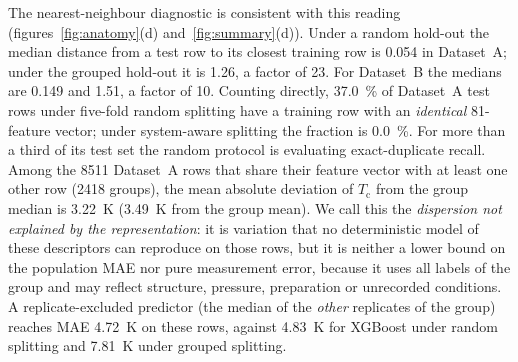 \documentclass{iopjournal}
\newcommand{\Tc}{T_{\mathrm c}}
\begin{document}
The nearest-neighbour diagnostic is consistent with this reading (figures~\ref{fig:anatomy}(d)
and~\ref{fig:summary}(d)). Under a random hold-out the median distance from a test row to its
closest training row is \num{0.054} in Dataset~A; under the grouped hold-out it is
\num{1.26}, a factor of \num{23}. For Dataset~B the medians are \num{0.149} and \num{1.51}, a
factor of \num{10}. Counting directly, \SI{37.0}{\percent} of Dataset~A test rows under five-fold
random splitting have a training row with an \emph{identical} \num{81}-feature vector; under
system-aware splitting the fraction is \SI{0.0}{\percent}. For more than a third of its test set the
random protocol is evaluating exact-duplicate recall. Among the \num{8511} Dataset~A rows that share
their feature vector with at least one other row (\num{2418} groups), the mean absolute deviation
of $\Tc$ from the group median is \SI{3.22}{\kelvin} (\SI{3.49}{\kelvin} from the group mean). We
call this the \emph{dispersion not explained by the representation}: it is variation that no
deterministic model of these descriptors can reproduce on those rows, but it is neither a lower
bound on the population MAE nor pure measurement error, because it uses all labels of the group and
may reflect structure, pressure, preparation or unrecorded conditions. A replicate-excluded
predictor (the median of the \emph{other} replicates of the group) reaches MAE \SI{4.72}{\kelvin}
on these rows, against \SI{4.83}{\kelvin} for XGBoost under random splitting and
\SI{7.81}{\kelvin} under grouped splitting.
\end{document}
